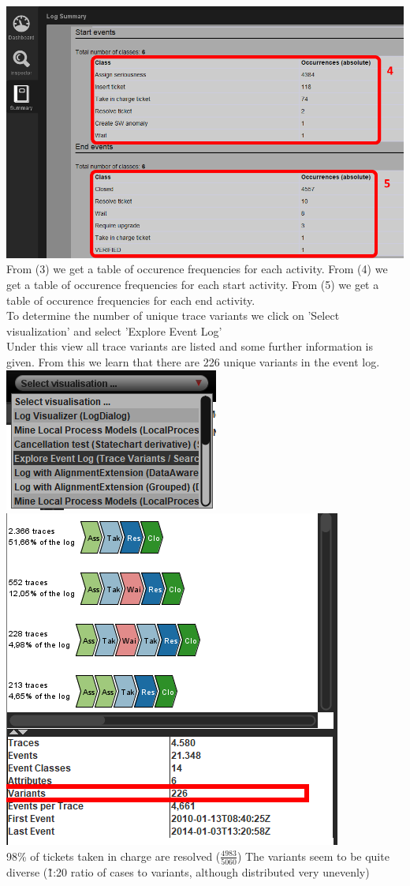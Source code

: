 \documentclass[../../main.tex]{subfiles}
\begin{document}
\includegraphics[width=0.5\columnwidth]{img/ProM_a_summary_2.png}\\
From (3) we get a table of occurence frequencies for each activity. From (4) we get a table of occurence frequencies for each start activity. From (5) we get a table of occurence frequencies for each end activity.\\
To determine the number of unique trace variants we click on 'Select visualization' and select 'Explore Event Log'\\
Under this view all trace variants are listed and some further information is given. From this we learn that there are 226 unique variants in the event log.\\
\includegraphics[width=0.5\columnwidth]{img/ProM_a_setting.png}\includegraphics[width=0.5\columnwidth]{img/ProM_a_traces.png}\\

98\% of tickets taken in charge are resolved ($\frac{4983}{5060}$)
The variants seem to be quite diverse (\~1:20 ratio of cases to variants, although distributed very unevenly)
\end{document}
